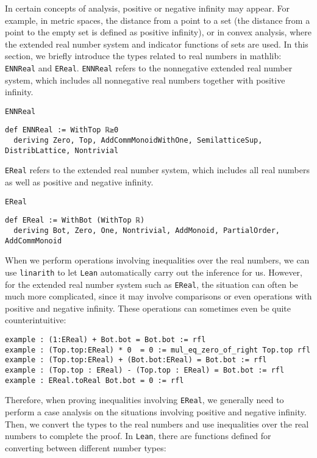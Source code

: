 \documentclass[a4paper]{article}
\begin{document}
In certain concepts of analysis, positive or negative infinity may appear. For example, in metric spaces, the distance from a point to a set (the distance from a point to the empty set is defined as positive infinity), or in convex analysis, where the extended real number system and indicator functions of sets are used. In this section, we briefly introduce the types related to real numbers in mathlib: \texttt{ENNReal} and \texttt{EReal}. \texttt{ENNReal} refers to the nonnegative extended real number system, which includes all nonnegative real numbers together with positive infinity.
\begin{dfn}{\texttt{ENNReal}}
\begin{lstlisting}[style=lean]
def ENNReal := WithTop ℝ≥0
  deriving Zero, Top, AddCommMonoidWithOne, SemilatticeSup, DistribLattice, Nontrivial
\end{lstlisting}
\end{dfn}
\texttt{EReal} refers to the extended real number system, which includes all real numbers as well as positive and negative infinity.
\begin{dfn}{\texttt{EReal}}
\begin{lstlisting}[style=lean]
def EReal := WithBot (WithTop ℝ)
  deriving Bot, Zero, One, Nontrivial, AddMonoid, PartialOrder, AddCommMonoid
\end{lstlisting}
\end{dfn}
When we perform operations involving inequalities over the real numbers, we can use \texttt{linarith} to let \texttt{Lean} automatically carry out the inference for us. However, for the extended real number system such as \texttt{EReal}, the situation can often be much more complicated, since it may involve comparisons or even operations with positive and negative infinity. These operations can sometimes even be quite counterintuitive:
\begin{xmp}{}
\begin{lstlisting}[style = lean]
example : (1:EReal) + Bot.bot = Bot.bot := rfl
example : (Top.top:EReal) * 0  = 0 := mul_eq_zero_of_right Top.top rfl
example : (Top.top:EReal) + (Bot.bot:EReal) = Bot.bot := rfl
example : (Top.top : EReal) - (Top.top : EReal) = Bot.bot := rfl
example : EReal.toReal Bot.bot = 0 := rfl
\end{lstlisting}
\end{xmp}
Therefore, when proving inequalities involving \texttt{EReal}, we generally need to perform a case analysis on the situations involving positive and negative infinity. Then, we convert the types to the real numbers and use inequalities over the real numbers to complete the proof. In \texttt{Lean}, there are functions defined for converting between different number types:
\end{document}
